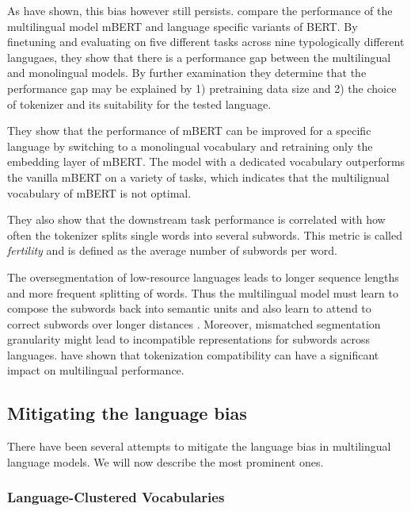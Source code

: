 As \citet{rust_how_2021} have shown, this bias however still persists. \citet{rust_how_2021} compare the performance of the multilingual model mBERT and language specific variants of BERT. By finetuning and evaluating on five different tasks across nine typologically different langugaes, they show that there is a performance gap between the multilingual and monolingual models. By further examination they determine that the performance gap may be explained by 1) pretraining data size and 2) the choice of tokenizer and its suitability for the tested language. 

They show that the performance of mBERT can be improved for a specific language by switching to a monolingual vocabulary and retraining only the embedding layer of mBERT. The model with a dedicated vocabulary outperforms the vanilla mBERT on a variety of tasks, which indicates that the multilignual vocabulary of mBERT is not optimal. 

They also show that the downstream task performance is correlated with how often the tokenizer splits single words into several subwords. This metric is called \textit{fertility} \cite{acs_exploring_2019} and is defined as the average number of subwords per word.

The oversegmentation of low-resource languages leads to longer sequence lengths and more frequent splitting of words. Thus the multilingual model must learn to compose the subwords back into semantic units and also learn to attend to correct subwords over longer distances \cite{chung_improving_2020}. Moreover, mismatched segmentation granularity might lead to incompatible representations for subwords across languages. \citet{maronikolakis_wine_2021} have shown that tokenization compatibility can have a significant impact on multilingual performance.

\subsection{Mitigating the language bias}

There have been several attempts to mitigate the language bias in multilingual language models. We will now describe the most prominent ones.


\subsubsection{Language-Clustered Vocabularies}

